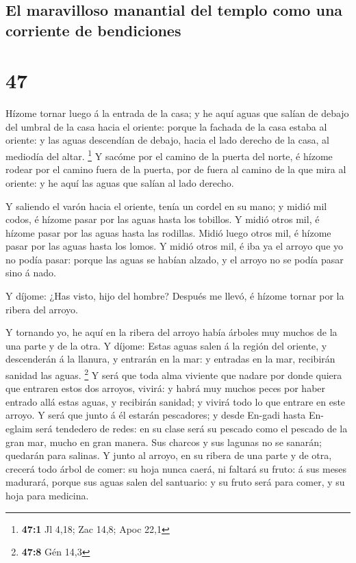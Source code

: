\hypertarget{el-maravilloso-manantial-del-templo-como-una-corriente-de-bendiciones}{%
\subsection{El maravilloso manantial del templo como una corriente de
bendiciones}\label{el-maravilloso-manantial-del-templo-como-una-corriente-de-bendiciones}}

\hypertarget{section-46}{%
\section{47}\label{section-46}}

 Hízome tornar luego á la entrada de la casa; y he aquí
aguas que salían de debajo del umbral de la casa hacia el oriente:
porque la fachada de la casa estaba al oriente: y las aguas descendían
de debajo, hacia el lado derecho de la casa, al mediodía del altar.
\footnote{\textbf{47:1} Jl 4,18; Zac 14,8; Apoc 22,1}  Y
sacóme por el camino de la puerta del norte, é hízome rodear por el
camino fuera de la puerta, por de fuera al camino de la que mira al
oriente: y he aquí las aguas que salían al lado derecho.

 Y saliendo el varón hacia el oriente, tenía un cordel en
su mano; y midió mil codos, é hízome pasar por las aguas hasta los
tobillos.  Y midió otros mil, é hízome pasar por las aguas
hasta las rodillas. Midió luego otros mil, é hízome pasar por las aguas
hasta los lomos.  Y midió otros mil, é iba ya el arroyo
que yo no podía pasar: porque las aguas se habían alzado, y el arroyo no
se podía pasar sino á nado.

 Y díjome: ¿Has visto, hijo del hombre? Después me llevó,
é hízome tornar por la ribera del arroyo.

 Y tornando yo, he aquí en la ribera del arroyo había
árboles muy muchos de la una parte y de la otra.  Y
díjome: Estas aguas salen á la región del oriente, y descenderán á la
llanura, y entrarán en la mar: y entradas en la mar, recibirán sanidad
las aguas. \footnote{\textbf{47:8} Gén 14,3}  Y será que
toda alma viviente que nadare por donde quiera que entraren estos dos
arroyos, vivirá: y habrá muy muchos peces por haber entrado allá estas
aguas, y recibirán sanidad; y vivirá todo lo que entrare en este arroyo.
 Y será que junto á él estarán pescadores; y desde
En-gadi hasta En-eglaim será tendedero de redes: en su clase será su
pescado como el pescado de la gran mar, mucho en gran manera.
 Sus charcos y sus lagunas no se sanarán; quedarán para
salinas.  Y junto al arroyo, en su ribera de una parte y
de otra, crecerá todo árbol de comer: su hoja nunca caerá, ni faltará su
fruto: á sus meses madurará, porque sus aguas salen del santuario: y su
fruto será para comer, y su hoja para medicina.

